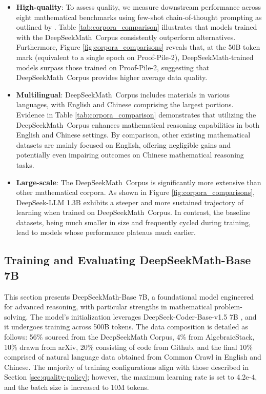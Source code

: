 \begin{itemize}[topsep=0pt]
\begin{itemize}[topsep=0pt]
\begin{itemize}[topsep=0pt]
    \item \textbf{High-quality}:
    To assess quality, we measure downstream performance across eight mathematical benchmarks using few-shot chain-of-thought prompting as outlined by \cite{cot}. Table \ref{tab:corpora_comparison} illustrates that models trained with the DeepSeekMath~Corpus consistently outperform alternatives. Furthermore, Figure \ref{fig:corpora_comparisons} reveals that, at the 50B token mark (equivalent to a single epoch on Proof-Pile-2), DeepSeekMath-trained models surpass those trained on Proof-Pile-2, suggesting that DeepSeekMath~Corpus provides higher average data quality.
    \item \textbf{Multilingual}:
    DeepSeekMath~Corpus includes materials in various languages, with English and Chinese comprising the largest portions. Evidence in Table \ref{tab:corpora_comparison} demonstrates that utilizing the DeepSeekMath~Corpus enhances mathematical reasoning capabilities in both English and Chinese settings. By comparison, other existing mathematical datasets are mainly focused on English, offering negligible gains and potentially even impairing outcomes on Chinese mathematical reasoning tasks.
    \item \textbf{Large-scale}:
    The DeepSeekMath~Corpus is significantly more extensive than other mathematical corpora. As shown in Figure \ref{fig:corpora_comparisons}, DeepSeek-LLM 1.3B exhibits a steeper and more sustained trajectory of learning when trained on DeepSeekMath~Corpus. In contrast, the baseline datasets, being much smaller in size and frequently cycled during training, lead to models whose performance plateaus much earlier.
\end{itemize}

\subsection{Training and Evaluating DeepSeekMath-Base 7B}

This section presents DeepSeekMath-Base 7B, a foundational model engineered for advanced reasoning, with particular strengths in mathematical problem-solving. The model’s initialization leverages DeepSeek-Coder-Base-v1.5 7B \citep{deepseek-coder}, and it undergoes training across 500B tokens. The data composition is detailed as follows: 56\% sourced from the DeepSeekMath Corpus, 4\% from AlgebraicStack, 10\% drawn from arXiv, 20\% consisting of code from Github, and the final 10\% comprised of natural language data obtained from Common Crawl in English and Chinese. The majority of training configurations align with those described in Section \ref{sec:quality-policy}; however, the maximum learning rate is set to 4.2e-4, and the batch size is increased to 10M tokens.


\end{itemize}
\end{itemize}
